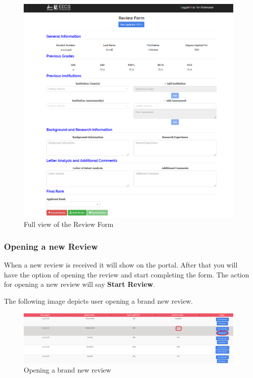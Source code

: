 \documentclass[fontsize=12pt,paper=letter,twoside]{scrartcl}
\begin{document}
\begin{figure}[!htb]
\begin{center}
\includegraphics[width=.99\textwidth]{images/cm/review_form.png}
\end{center}
\caption{Full view of the Review Form}
\label{fig:cm:review_form}
\end{figure}

\clearpage
\newpage
\subsubsection{Opening a new Review}
When a new review is received it will show on the portal. After that you will have the option of opening the review and start completing the form. The action for opening a new review will say \textbf{Start Review}.

\bigskip
\noindent The following image depicts user opening a brand new review.

\begin{figure}[!htb]
\begin{center}
\includegraphics[width=.99\textwidth]{images/cm/opening_new_review.png}
\end{center}
\caption{Opening a brand new review}
\label{fig:cm:opening_new_review}
\end{figure}
\end{document}
